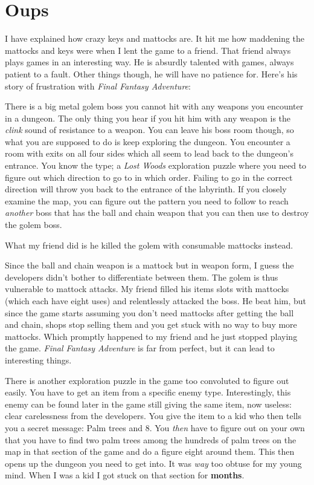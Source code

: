 \documentclass{book}
\begin{document}
\FloatBarrier\section*{Oups}
I have explained how crazy keys and mattocks are. It hit me how maddening the mattocks and keys were when I lent the game to a friend. That friend always plays games in an interesting way. He is absurdly talented with games, always patient to a fault. Other things though, he will have no patience for. Here’s his story of frustration with \emph{Final Fantasy Adventure}:\par
There is a big metal golem boss you cannot hit with any weapons you encounter in a dungeon. The only thing you hear if you hit him with any weapon is the \emph{clink} sound of resistance to a weapon. You can leave his boss room though, so what you are supposed to do is keep exploring the dungeon. You encounter a room with exits on all four sides which all seem to lead back to the dungeon’s entrance. You know the type; a \emph{Lost Woods} exploration puzzle where you need to figure out which direction to go to in which order. Failing to go in the correct direction will throw you back to the entrance of the labyrinth. If you closely examine the map, you can figure out the pattern you need to follow to reach \emph{another} boss that has the ball and chain weapon that you can then use to destroy the golem boss.\par
What my friend did is he killed the golem with consumable mattocks instead.\par
Since the ball and chain weapon is a mattock but in weapon form, I guess the developers didn’t bother to differentiate between them. The golem is thus vulnerable to mattock attacks. My friend filled his items slots with mattocks (which each have eight uses) and relentlessly attacked the boss. He beat him, but since the game starts assuming you don’t need mattocks after getting the ball and chain, shops stop selling them and you get stuck with no way to buy more mattocks. Which promptly happened to my friend and he just stopped playing the game. \emph{Final Fantasy Adventure} is far from perfect, but it can lead to interesting things.\par
There is another exploration puzzle in the game too convoluted to figure out easily. You have to get an item from a specific enemy type. Interestingly, this enemy can be found later in the game still giving the same item, now useless: clear carelessness from the developers. You give the item to a kid who then tells you a secret message: Palm trees and 8. You \emph{then} have to figure out on your own that you have to find two palm trees among the hundreds of palm trees on the map in that section of the game and do a figure eight around them. This then opens up the dungeon you need to get into. It was \emph{way} too obtuse for my young mind. When I was a kid I got stuck on that section for \textbf{months}.\par
\end{document}
